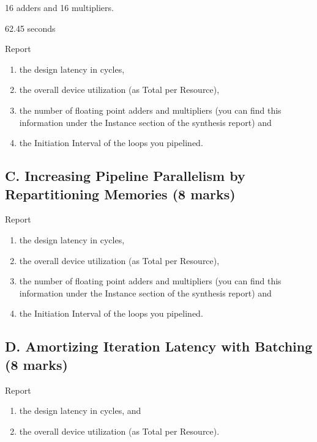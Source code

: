 16 adders and 16 multipliers.

62.45 seconds

Report
\begin{enumerate}
    \item the design latency in cycles,
    \item the overall device utilization (as Total per Resource),
    \item the number of floating point adders and multipliers
          (you can find this information under the Instance section of the synthesis report) and
    \item the Initiation Interval of the loops you pipelined.
\end{enumerate}

\subsection{C. Increasing Pipeline Parallelism by Repartitioning Memories (8 marks)}

Report
\begin{enumerate}
    \item the design latency in cycles,
    \item the overall device utilization (as Total per Resource),
    \item the number of floating point adders and multipliers (you can find this information under the Instance section of the synthesis report) and
    \item the Initiation Interval of the loops you pipelined.
\end{enumerate}

\subsection{D. Amortizing Iteration Latency with Batching (8 marks)}

Report \begin{enumerate}
    \item the design latency in cycles, and
    \item the overall device utilization (as Total per Resource).
\end{enumerate}


